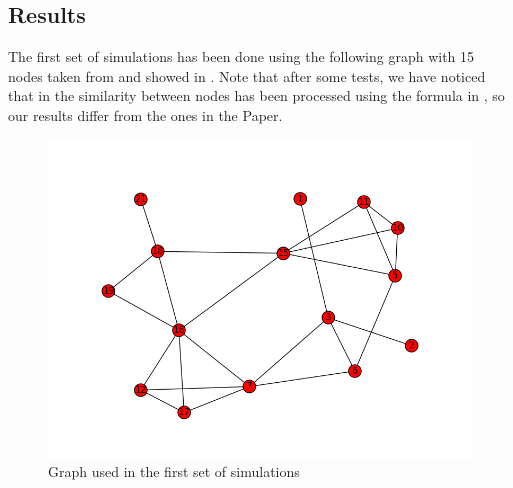 \documentclass[12pt]{article}
\begin{document}
\subsection{Results}
The first set of simulations has been done using the following graph with 15 nodes taken from \cite{6517336} and showed in . Note that after some tests, we have noticed that in \cite{6517336} the similarity between nodes has been processed using the formula in , so our results differ from the ones in the Paper.
     \begin{figure}[H]
       \centering
         \includegraphics[width=1\textwidth]{graphpaper.png}
       \caption{Graph used in the first set of simulations}
       \label{fig:graphpaper}
     \end{figure}
\end{document}
